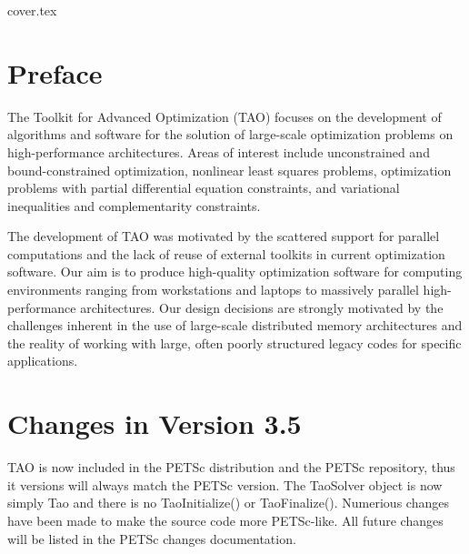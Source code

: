 \documentclass[]{book}
\begin{document}
\pagestyle {empty}


%
 {cover.tex}



\section*{Preface}

The Toolkit for Advanced Optimization (TAO) focuses on the development
of algorithms and software for the solution of large-scale optimization 
problems on high-performance architectures.  Areas of interest include 
unconstrained and bound-constrained optimization, nonlinear least squares 
problems, optimization problems with partial differential equation 
constraints, and variational inequalities and complementarity 
constraints.

The development of TAO was motivated by the scattered support for
parallel computations and the lack of reuse of external toolkits in
current optimization software.  Our aim is to produce high-quality 
optimization software for computing environments ranging from 
workstations and laptops to massively parallel high-performance 
architectures.  Our design decisions are strongly motivated by 
the challenges inherent in the use of large-scale distributed 
memory architectures and the reality of working with large, 
often poorly structured legacy codes for specific 
applications.



\section*{Changes in Version 3.5}
TAO is now included in the PETSc distribution and the PETSc
repository, thus it versions will always match the PETSc version. The
TaoSolver object is now simply Tao and there is no TaoInitialize() or
TaoFinalize(). Numerious changes have been made to make the source
code more PETSc-like.  All future changes will be listed in the PETSc changes documentation.
\end{document}

